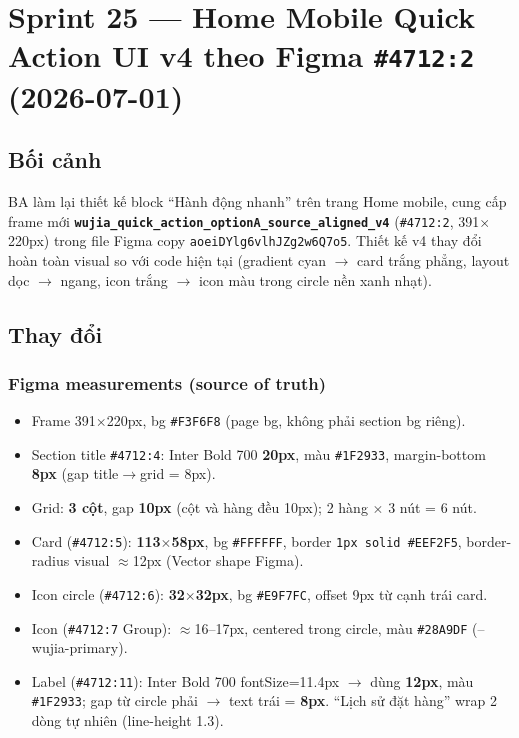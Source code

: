\chapter{Sprint 25 --- Home Mobile Quick Action UI v4 theo Figma \texttt{\#4712:2} (2026-07-01)}

\section{Bối cảnh}

BA làm lại thiết kế block ``Hành động nhanh'' trên trang Home mobile, cung cấp frame mới \textbf{\texttt{wujia\_quick\_action\_optionA\_source\_aligned\_v4}} (\texttt{\#4712:2}, 391$\times$220px) trong file Figma copy \texttt{aoeiDYlg6vlhJZg2w6Q7o5}. Thiết kế v4 thay đổi hoàn toàn visual so với code hiện tại (gradient cyan $\rightarrow$ card trắng phẳng, layout dọc $\rightarrow$ ngang, icon trắng $\rightarrow$ icon màu trong circle nền xanh nhạt).

\section{Thay đổi}

\subsection{Figma measurements (source of truth)}

\begin{itemize}
  \item Frame 391$\times$220px, bg \texttt{\#F3F6F8} (page bg, không phải section bg riêng).
  \item Section title \texttt{\#4712:4}: Inter Bold 700 \textbf{20px}, màu \texttt{\#1F2933}, margin-bottom \textbf{8px} (gap title$\rightarrow$grid = 8px).
  \item Grid: \textbf{3 cột}, gap \textbf{10px} (cột và hàng đều 10px); 2 hàng $\times$ 3 nút = 6 nút.
  \item Card (\texttt{\#4712:5}): \textbf{113$\times$58px}, bg \texttt{\#FFFFFF}, border \texttt{1px solid \#EEF2F5}, border-radius visual $\approx$12px (Vector shape Figma).
  \item Icon circle (\texttt{\#4712:6}): \textbf{32$\times$32px}, bg \texttt{\#E9F7FC}, offset 9px từ cạnh trái card.
  \item Icon (\texttt{\#4712:7} Group): $\approx$16--17px, centered trong circle, màu \texttt{\#28A9DF} (--wujia-primary).
  \item Label (\texttt{\#4712:11}): Inter Bold 700 fontSize=11.4px $\rightarrow$ dùng \textbf{12px}, màu \texttt{\#1F2933}; gap từ circle phải $\rightarrow$ text trái = \textbf{8px}. ``Lịch sử đặt hàng'' wrap 2 dòng tự nhiên (line-height 1.3).
\end{itemize}

